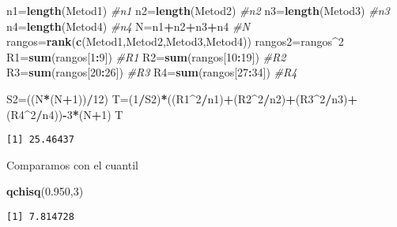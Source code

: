 \documentclass[a4paper,oneside,openany]{book}
\newenvironment{Shaded}{\begin{snugshade}}{\end{snugshade}}
\newcommand{\KeywordTok}[1]{\textcolor[rgb]{0.13,0.29,0.53}{\textbf{#1}}}
\newcommand{\DecValTok}[1]{\textcolor[rgb]{0.00,0.00,0.81}{#1}}
\newcommand{\FloatTok}[1]{\textcolor[rgb]{0.00,0.00,0.81}{#1}}
\newcommand{\CommentTok}[1]{\textcolor[rgb]{0.56,0.35,0.01}{\textit{#1}}}
\newcommand{\OperatorTok}[1]{\textcolor[rgb]{0.81,0.36,0.00}{\textbf{#1}}}
\newcommand{\NormalTok}[1]{#1}
\begin{document}
\begin{Shaded}
\begin{Highlighting}[]
\NormalTok{n1=}\KeywordTok{length}\NormalTok{(Metod1)}
\CommentTok{#n1}
\NormalTok{n2=}\KeywordTok{length}\NormalTok{(Metod2)}
\CommentTok{#n2}
\NormalTok{n3=}\KeywordTok{length}\NormalTok{(Metod3)}
\CommentTok{#n3}
\NormalTok{n4=}\KeywordTok{length}\NormalTok{(Metod4)}
\CommentTok{#n4}
\NormalTok{N=n1}\OperatorTok{+}\NormalTok{n2}\OperatorTok{+}\NormalTok{n3}\OperatorTok{+}\NormalTok{n4}
\CommentTok{#N}
\NormalTok{rangos=}\KeywordTok{rank}\NormalTok{(}\KeywordTok{c}\NormalTok{(Metod1,Metod2,Metod3,Metod4))}
\NormalTok{rangos2=rangos}\OperatorTok{^}\DecValTok{2}
\NormalTok{R1=}\KeywordTok{sum}\NormalTok{(rangos[}\DecValTok{1}\OperatorTok{:}\DecValTok{9}\NormalTok{])}
\CommentTok{#R1}
\NormalTok{R2=}\KeywordTok{sum}\NormalTok{(rangos[}\DecValTok{10}\OperatorTok{:}\DecValTok{19}\NormalTok{])}
\CommentTok{#R2}
\NormalTok{R3=}\KeywordTok{sum}\NormalTok{(rangos[}\DecValTok{20}\OperatorTok{:}\DecValTok{26}\NormalTok{])}
\CommentTok{#R3}
\NormalTok{R4=}\KeywordTok{sum}\NormalTok{(rangos[}\DecValTok{27}\OperatorTok{:}\DecValTok{34}\NormalTok{])}
\CommentTok{#R4}


\NormalTok{S2=((N}\OperatorTok{*}\NormalTok{(N}\OperatorTok{+}\DecValTok{1}\NormalTok{))}\OperatorTok{/}\DecValTok{12}\NormalTok{)}
\NormalTok{T=(}\DecValTok{1}\OperatorTok{/}\NormalTok{S2)}\OperatorTok{*}\NormalTok{((R1}\OperatorTok{^}\DecValTok{2}\OperatorTok{/}\NormalTok{n1)}\OperatorTok{+}\NormalTok{(R2}\OperatorTok{^}\DecValTok{2}\OperatorTok{/}\NormalTok{n2)}\OperatorTok{+}\NormalTok{(R3}\OperatorTok{^}\DecValTok{2}\OperatorTok{/}\NormalTok{n3)}\OperatorTok{+}\NormalTok{(R4}\OperatorTok{^}\DecValTok{2}\OperatorTok{/}\NormalTok{n4))}\OperatorTok{-}\DecValTok{3}\OperatorTok{*}\NormalTok{(N}\OperatorTok{+}\DecValTok{1}\NormalTok{)}
\NormalTok{T}
\end{Highlighting}
\end{Shaded}

\begin{verbatim}
[1] 25.46437
\end{verbatim}

Comparamos con el cuantil

\begin{Shaded}
\begin{Highlighting}[]
\KeywordTok{qchisq}\NormalTok{(}\FloatTok{0.950}\NormalTok{,}\DecValTok{3}\NormalTok{)}
\end{Highlighting}
\end{Shaded}

\begin{verbatim}
[1] 7.814728
\end{verbatim}
\end{document}
